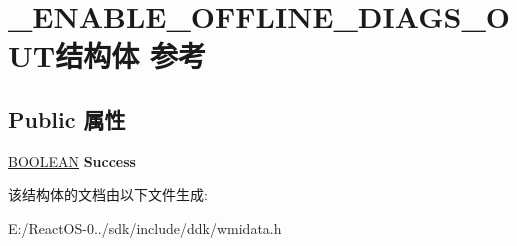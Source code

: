 \hypertarget{struct___e_n_a_b_l_e___o_f_f_l_i_n_e___d_i_a_g_s___o_u_t}{}\section{\+\_\+\+E\+N\+A\+B\+L\+E\+\_\+\+O\+F\+F\+L\+I\+N\+E\+\_\+\+D\+I\+A\+G\+S\+\_\+\+O\+U\+T结构体 参考}
\label{struct___e_n_a_b_l_e___o_f_f_l_i_n_e___d_i_a_g_s___o_u_t}
\subsection*{Public 属性}
\begin{DoxyCompactItemize}
\item 
\mbox{\label{struct___e_n_a_b_l_e___o_f_f_l_i_n_e___d_i_a_g_s___o_u_t_ae0f760729cefb2e13458b568129e7cab}} 
\hyperlink{_processor_bind_8h_a112e3146cb38b6ee95e64d85842e380a}{B\+O\+O\+L\+E\+AN} {\bfseries Success}
\end{DoxyCompactItemize}


该结构体的文档由以下文件生成\+:\begin{DoxyCompactItemize}
\item 
E\+:/\+React\+O\+S-\/0../sdk/include/ddk/wmidata.\+h\end{DoxyCompactItemize}

